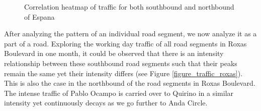 \begin{figure}[h] 
\centering
    \centering
      \captionsetup{justification=centering}
    \hfill
    \caption{Correlation heatmap of traffic for both southbound and northbound of Espana}

    \label{figure_traffic_espana_corr}
\end{figure}


After analyzing the pattern of an individual road segment, we now analyze it as a part of a road. Exploring the working day traffic of all road segments in Roxas Boulevard in one month, it could be observed that there is an intensity relationship between these southbound road segments such that their peaks remain the same yet their intensity differs (see Figure \ref{figure_traffic_roxas}). This is also the case in the northbound of the road segments in Roxas Boulevard. The intense traffic of Pablo Ocampo is carried over to Quirino in a similar intensity yet continuously decays as we go further to Anda Circle.



